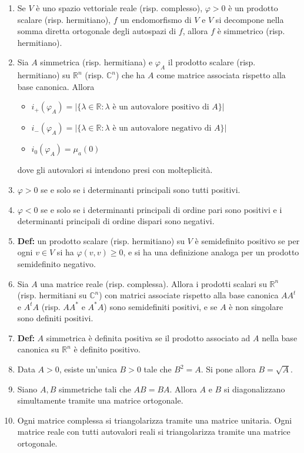 \documentclass[a4paper,11pt]{article}
\newcommand{\tras}[1]{#1^t}						%
\newcommand{\agg}[1]{#1^*}							%
\begin{document}
\begin{enumerate}[resume]
	\item Se $V$ è uno spazio vettoriale reale (risp. complesso), $\varphi>0$ è un prodotto scalare (risp. hermitiano), $f$ un endomorfismo di $V$ e $V$ si decompone nella somma diretta ortogonale degli autospazi di $f$, allora $f$ è simmetrico (risp. hermitiano).
	\item Sia $A$ simmetrica (risp. hermitiana) e $\varphi_A$ il prodotto scalare (risp. hermitiano) su $\mathbb{R}^n$ (risp. $\mathbb{C}^n$) che ha $A$ come matrice associata rispetto alla base canonica. Allora
	\begin{itemize}
		\item $i_+(\varphi_A)=\left|\{\lambda\in\mathbb{R}:\lambda\textrm{ è un autovalore positivo di $A$}\}\right|$
		\item $i_-(\varphi_A)=\left|\{\lambda\in\mathbb{R}:\lambda\textrm{ è un autovalore negativo di $A$}\}\right|$
		\item $i_0(\varphi_A)=\mu_a(0)$
	\end{itemize}
	dove gli autovalori si intendono presi con molteplicità.
	\item $\varphi>0$ se e solo se i determinanti principali sono tutti positivi.
	\item $\varphi<0$ se e solo se i determinanti principali di ordine pari sono positivi e i determinanti principali di ordine dispari sono negativi.
	\item\textbf{Def:} un prodotto scalare (risp. hermitiano) su $V$ è semidefinito positivo se per ogni $v\in V$ si ha $\varphi(v,v)\geq0$, e si ha una definizione analoga per un prodotto semidefinito negativo.
	\item Sia $A$ una matrice reale (risp. complessa). Allora i prodotti scalari su $\mathbb{R}^n$ (risp. hermitiani su $\mathbb{C}^n$) con matrici associate rispetto alla base canonica $A\tras{A}$ e $\tras{A}A$ (risp. $A\agg{A}$ e $\agg{A}A$) sono semidefiniti positivi, e se $A$ è non singolare sono definiti positivi.
	\item\textbf{Def:} $A$ simmetrica è definita positiva se il prodotto associato ad $A$ nella base canonica su $\mathbb{R}^n$ è definito positivo.
	\item Data $A>0$, esiste un'unica $B>0$ tale che $B^2=A$. Si pone allora $B=\sqrt{A}$.
	\item Siano $A,B$ simmetriche tali che $AB=BA$. Allora $A$ e $B$ si diagonalizzano simultamente tramite una matrice ortogonale.
	\item Ogni matrice complessa si triangolarizza tramite una matrice unitaria. Ogni matrice reale con tutti autovalori reali si triangolarizza tramite una matrice ortogonale.

\end{enumerate}
\end{document}
